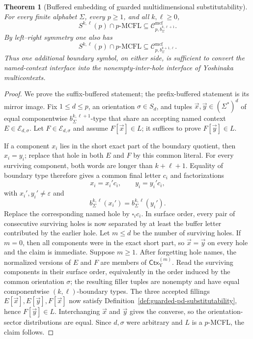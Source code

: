 \documentclass[11pt,a4paper]{article}
\numberwithin{equation}{section}
\theoremstyle{plain}
\newtheorem{theorem}{Theorem}[section]
\theoremstyle{definition}
\theoremstyle{remark}
\newcommand{\Cmcf}[2]{\mathcal{C}^{\mathrm{mcf}}_{#1,#2}}
\newcommand{\tuple}[1]{\vec{#1}}
\newcommand{\blank}{\square}
\newcommand{\eps}{\varepsilon}
\begin{document}
\begin{theorem}[Buffered embedding of guarded multidimensional substitutability]
\label{thm:guarded-buffered-embedding}
For every finite alphabet \(\Sigma\), every \(p\ge1\), and all
\(k,\ell\ge0\),
\[
  S^{k,\ell}(p)\cap p\text{-}\mathrm{MCFL}
  \subseteq
  \Cmcf{p}{b_\Sigma^{k,\ell+1}}.
\]
By left--right symmetry one also has
\[
  S^{k,\ell}(p)\cap p\text{-}\mathrm{MCFL}
  \subseteq
  \Cmcf{p}{b_\Sigma^{k+1,\ell}}.
\]
Thus one additional boundary symbol, on either side, is sufficient to convert
the named-context interface into the nonempty-inter-hole interface of
Yoshinaka multicontexts.
\end{theorem}

\begin{proof}
We prove the suffix-buffered statement; the prefix-buffered statement is its
mirror image.  Fix \(1\le d\le p\), an orientation \(\sigma\in S_d\), and
tuples \(\tuple x,\tuple y\in(\Sigma^*)^d\) of equal componentwise
\(b_\Sigma^{k,\ell+1}\)-type that share an accepting named context
\(E\in\mathcal E_{d,\sigma}\).  Let \(F\in\mathcal E_{d,\sigma}\) and assume
\(F[\tuple x]\in L\); it suffices to prove \(F[\tuple y]\in L\).

If a component \(x_i\) lies in the short exact part of the boundary quotient,
then \(x_i=y_i\); replace that hole in both \(E\) and \(F\) by this common
literal.  For every surviving component, both words are longer than
\(k+\ell+1\).  Equality of boundary type therefore gives a common final
letter \(c_i\) and factorizations
\[
  x_i=x_i'c_i,\qquad y_i=y_i'c_i,
\]
with \(x_i',y_i'\ne\eps\) and
\[
  b_\Sigma^{k,\ell}(x_i')=b_\Sigma^{k,\ell}(y_i').
\]
Replace the corresponding named hole by \(\blank_i c_i\).  In surface order,
every pair of consecutive surviving holes is now separated by at least the
buffer letter contributed by the earlier hole.  Let \(m\le d\) be the number of surviving holes.  If \(m=0\), then all
components were in the exact short part, so \(\tuple x=\tuple y\) on every
hole and the claim is immediate.  Suppose \(m\ge1\).  After forgetting hole
names, the normalized versions of \(E\) and \(F\) are members of
\(\mathsf{Ctx}_{\mathrm Y}^{(m)}\).  Read the surviving components in their
surface order, equivalently in the order induced by the common orientation
\(\sigma\); the resulting filler tuples are nonempty and have equal
componentwise \((k,\ell)\)-boundary types.  The three accepted fillings
\(E[\tuple x],E[\tuple y],F[\tuple x]\) now satisfy
Definition~\ref{def:guarded-pd-substitutability}, hence
\(F[\tuple y]\in L\).  Interchanging \(\tuple x\) and \(\tuple y\) gives the
converse, so the orientation-sector distributions are equal.  Since
\(d,\sigma\) were arbitrary and \(L\) is a \(p\)-MCFL, the claim follows.
\end{proof}
\end{document}
